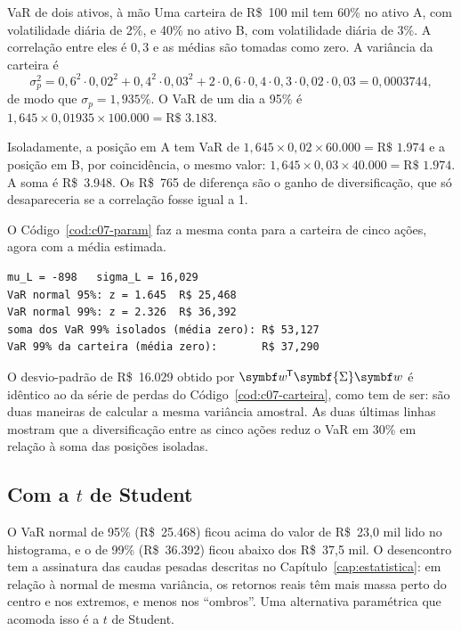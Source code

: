 \begin{exemplo}{VaR de dois ativos, à mão}
Uma carteira de R\$~100 mil tem 60\% no ativo A, com volatilidade diária de 2\%, e 40\% no ativo B, com volatilidade diária de 3\%. A correlação entre eles é $0,3$ e as médias são tomadas como zero. A variância da carteira é
\[
  \sigma_p^2 = 0,6^2 \cdot 0,02^2 + 0,4^2 \cdot 0,03^2 + 2 \cdot 0,6 \cdot 0,4 \cdot 0,3 \cdot 0,02 \cdot 0,03 = 0,0003744 ,
\]
de modo que $\sigma_p = 1,935\%$. O VaR de um dia a 95\% é $1,645 \times 0,01935 \times 100.000 = \text{R\$~}3.183$.

Isoladamente, a posição em A tem VaR de $1,645 \times 0,02 \times 60.000 = \text{R\$~}1.974$ e a posição em B, por coincidência, o mesmo valor: $1,645 \times 0,03 \times 40.000 = \text{R\$~}1.974$. A soma é R\$~3.948. Os R\$~765 de diferença são o ganho de diversificação, que só desapareceria se a correlação fosse igual a 1.
\end{exemplo}

O Código~\ref{cod:c07-param} faz a mesma conta para a carteira de cinco ações, agora com a média estimada.


\begin{lstlisting}[style=saida]
mu_L = -898   sigma_L = 16,029
VaR normal 95%: z = 1.645  R$ 25,468
VaR normal 99%: z = 2.326  R$ 36,392
soma dos VaR 99% isolados (média zero): R$ 53,127
VaR 99% da carteira (média zero):       R$ 37,290
\end{lstlisting}

O desvio-padrão de R\$~16.029 obtido por $\vetor{w}\T\symbf{\Sigma}\vetor{w}$ é idêntico ao da série de perdas do Código~\ref{cod:c07-carteira}, como tem de ser: são duas maneiras de calcular a mesma variância amostral. As duas últimas linhas mostram que a diversificação entre as cinco ações reduz o VaR em 30\% em relação à soma das posições isoladas.

\subsection{Com a $t$ de Student}

O VaR normal de 95\% (R\$~25.468) ficou acima do valor de R\$~23,0 mil lido no histograma, e o de 99\% (R\$~36.392) ficou abaixo dos R\$~37,5 mil. O desencontro tem a assinatura das caudas pesadas descritas no Capítulo~\ref{cap:estatistica}: em relação à normal de mesma variância, os retornos reais têm mais massa perto do centro e nos extremos, e menos nos ``ombros''. Uma alternativa paramétrica que acomoda isso é a $t$ de Student.


